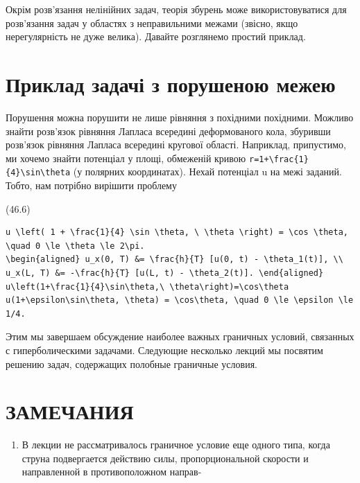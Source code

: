 \documentclass[
  ukrainian,
]{article}
\providecommand{\tightlist}{%
  \setlength{\itemsep}{0pt}\setlength{\parskip}{0pt}}
\begin{document}
Окрім розв'язання нелінійних задач, теорія збурень може
використовуватися для розв'язання задач у областях з неправильними
межами (звісно, якщо нерегулярність не дуже велика). Давайте розглянемо
простий приклад.

\section{Приклад задачі з порушеною
межею}\label{ux43fux440ux438ux43aux43bux430ux434-ux437ux430ux434ux430ux447ux456-ux437-ux43fux43eux440ux443ux448ux435ux43dux43eux44e-ux43cux435ux436ux435ux44e}

Порушення можна порушити не лише рівняння з похідними похідними. Можливо
знайти розв'язок рівняння Лапласа всередині деформованого кола, збуривши
розв'язок рівняння Лапласа всередині кругової області. Наприклад,
припустимо, ми хочемо знайти потенціал у площі, обмеженій кривою
\texttt{r=1+\textbackslash{}frac\{1\}\{4\}\textbackslash{}sin\textbackslash{}theta}
(у полярних координатах). Нехай потенціал u на межі заданий. Тобто, нам
потрібно вирішити проблему

(46.6)

\begin{verbatim}
u \left( 1 + \frac{1}{4} \sin \theta, \ \theta \right) = \cos \theta, \quad 0 \le \theta \le 2\pi.
\begin{aligned} u_x(0, T) &= \frac{h}{T} [u(0, t) - \theta_1(t)], \\ u_x(L, T) &= -\frac{h}{T} [u(L, t) - \theta_2(t)]. \end{aligned}
u\left(1+\frac{1}{4}\sin\theta,\ \theta\right)=\cos\theta
u(1+\epsilon\sin\theta, \theta) = \cos\theta, \quad 0 \le \epsilon \le 1/4.
\end{verbatim}

Этим мы завершаем обсуждение наиболее важных граничных условий,
связанных с гиперболическими задачами. Следующие несколько лекций мы
посвятим решению задач, содержащих полобные граничные условия.

\section{ЗАМЕЧАНИЯ}\label{ux437ux430ux43cux435ux447ux430ux43dux438ux44f-6}

\begin{enumerate}
\def\labelenumi{\arabic{enumi}.}
\tightlist
\item
  В лекции не рассматривалось граничное условие еще одного типа, когда
  струна подвергается действию силы, пропорциональной скорости и
  направленной в противоположном направ-
\end{enumerate}
\end{document}
